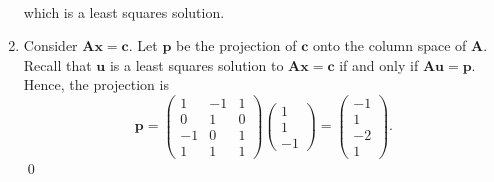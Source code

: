 \documentclass[12pt]{article}
\begin{document}
\begin{enumerate}[label=\textbf{(\alph*)}]
\begin{align*}
    \end{align*}
    which is a least squares solution.
    \item Consider $\mathbf{Ax}=\mathbf{c}$. Let $\mathbf{p}$ be the projection of $\mathbf{c}$ onto the column space of $\mathbf{A}$. Recall that $\mathbf{u}$ is a least squares solution to $\mathbf{Ax}=\mathbf{c}$ if and only if $\mathbf{Au}=\mathbf{p}$. Hence, the projection is \[\mathbf{p}= \begin{pmatrix}
1 & -1 & 1 \\
0 & 1 & 0 \\
-1 & 0 & 1 \\
1 & 1 & 1
\end{pmatrix}\begin{pmatrix}1\\ 1\\ -1\end{pmatrix}=\begin{pmatrix}-1\\ 1\\ -2\\ 1\end{pmatrix}.\] \qed 
\end{enumerate}
\newpage
\end{document}
